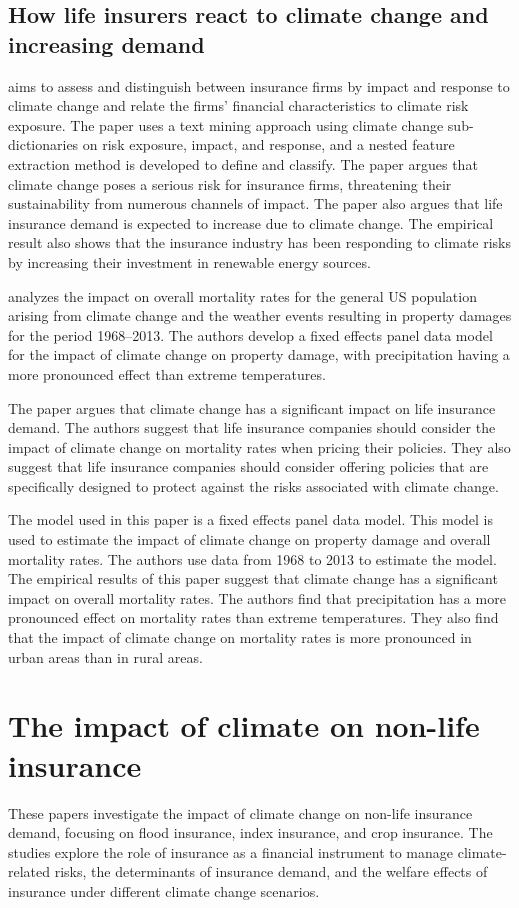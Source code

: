 \documentclass[a4paper,12pt]{article}
\begin{document}
\subsection{How life insurers react to climate change and increasing demand}
\cite{gupta2023assessing} aims to assess and distinguish between insurance firms by impact and response to climate change and relate the firms’ financial characteristics to climate risk exposure. The paper uses a text mining approach using climate change sub-dictionaries on risk exposure, impact, and response, and a nested feature extraction method is developed to define and classify. The paper argues that climate change poses a serious risk for insurance firms, threatening their sustainability from numerous channels of impact. The paper also argues that life insurance demand is expected to increase due to climate change. The empirical result also shows that the insurance industry has been responding to climate risks by increasing their investment in renewable energy sources.

\cite{miljkovic2018examining} analyzes the impact on overall mortality rates for the general US population arising from climate change and the weather events resulting in property damages for the period 1968–2013. The authors develop a fixed effects panel data model for the impact of climate change on property damage, with precipitation having a more pronounced effect than extreme temperatures.

The paper argues that climate change has a significant impact on life insurance demand. The authors suggest that life insurance companies should consider the impact of climate change on mortality rates when pricing their policies. They also suggest that life insurance companies should consider offering policies that are specifically designed to protect against the risks associated with climate change.

The model used in this paper is a fixed effects panel data model. This model is used to estimate the impact of climate change on property damage and overall mortality rates. The authors use data from 1968 to 2013 to estimate the model. The empirical results of this paper suggest that climate change has a significant impact on overall mortality rates. The authors find that precipitation has a more pronounced effect on mortality rates than extreme temperatures. They also find that the impact of climate change on mortality rates is more pronounced in urban areas than in rural areas.

\section{The impact of climate on non-life insurance}
These papers investigate the impact of climate change on non-life insurance demand, focusing on flood insurance, index insurance, and crop insurance. The studies explore the role of insurance as a financial instrument to manage climate-related risks, the determinants of insurance demand, and the welfare effects of insurance under different climate change scenarios.
\end{document}
